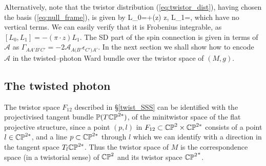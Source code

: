 Alternatively, note that the twistor distribution (\ref{eq:twistor_dist}), having chosen the basis (\ref{eq:null_frame}), is given by
\be
\label{tdistribution}
L_{0}=\pi\cdot{}+(z\cdot\pi) z\cdot{}, \quad
L_{1}=\pi\cdot{},
\ee
which have no vertical terms. We can easily verify that it is Frobenius integrable, as $[L_{0}, L_{1}]=-(\pi\cdot z)L_{1}$. The SD part of the
spin connection is given in terms of ${\mathcal A}$ as
$\Gamma_{AA'B'C'}=-2{\mathcal A}_{A(B'}\epsilon_{C')A'}$.
\koniec
In the next section we shall show how to encode
${\mathcal A}$ in the twisted--photon Ward bundle over the twistor space
of $(M, g)$.
\subsection{The twisted photon}
The twistor space $F_{12}$ described in \S\ref{twist_SSS} can be identified with the projectivised tangent bundle ${\mathbb{P}(T\mathbb{CP}^{2*})}$, of the minitwistor space of the flat projective structure, since a point $(p,l)$ in $F_{12}\subset\mathbb{CP}^2\times\mathbb{CP}^{2*}$ consists of a point $l\in\mathbb{CP}^{2*}$, and a line $p\subset\mathbb{CP}^{2*}$ through $l$ which we can identify with a direction in the tangent space $T_l\mathbb{CP}^{2*}$. Thus the twistor space of $M$ is the correspondence space (in a twistorial sense) of $\mathbb{CP}^2$ and its twistor space ${\mathbb{CP}^2}^*$.
 
